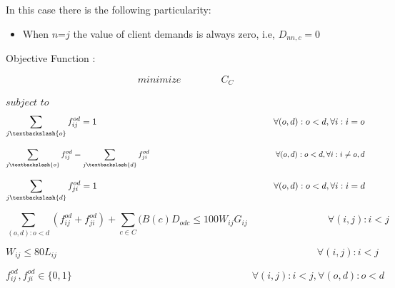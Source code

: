 \vspace{11pt}
In this case there is the following particularity:

\begin{itemize}
  \item When $n$=$j$ the value of client demands is always zero, i.e, $D_{nn,c}=0$ 
\end{itemize}


\vspace{17pt}
Objective Function :

\begin{equation}
minimize \qquad \qquad C_C
\label{ILPOpaque_Surv}
\end{equation}

$subject$ $to$
\begin{equation}
\sum_{j\textbackslash \{o\}} f_{ij}^{od} = 1  \qquad \qquad \qquad \qquad \qquad \qquad \qquad \qquad \qquad \qquad
\forall(o,d) : o < d, \forall i: i = o
\label{ILPOpaque1_Surv}
\end{equation}

\begin{equation}
\sum_{j\textbackslash \{o\}} f_{ij}^{od} = \sum_{j\textbackslash \{d\}} f_{ji}^{od}   \qquad \qquad \qquad \qquad \qquad \qquad \qquad \qquad
\forall(o,d) : o < d, \forall i: i \neq o,d
\label{ILPOpaque2_Surv}
\end{equation}

\begin{equation}
\sum_{j\textbackslash \{d\}} f_{ji}^{od} = 1  \qquad \qquad \qquad \qquad \qquad \qquad \qquad \qquad \qquad \qquad
\forall(o,d) : o < d, \forall i: i = d
\label{ILPOpaque3_Surv}
\end{equation}

\begin{equation}
\sum_{(o,d):o<d} \left(f_{ij}^{od} + f_{ji}^{od}\right) + \sum_{c\in C} (B\left(c\right) D_{odc}\leq100 W_{ij} G_{ij} \qquad \qquad \qquad \qquad
\forall(i,j) : i < j
\label{ILPOpaque4_Surv}
\end{equation}

\begin{equation}
W_{ij} \leq 80 L_{ij} \qquad  \qquad \qquad \qquad \qquad \qquad \qquad \qquad \qquad \qquad \qquad \qquad \qquad \forall(i,j) : i < j
\label{ILPOpaque5_Surv}
\end{equation}

\begin{equation}
f_{ij}^{od} , f_{ji}^{od} \in \{0,1\}   \qquad \qquad \qquad \qquad \qquad \qquad \qquad \qquad \qquad
\forall(i,j) : i < j, \forall(o,d) : o < d
\label{ILPOpaque6_Surv}
\end{equation}


